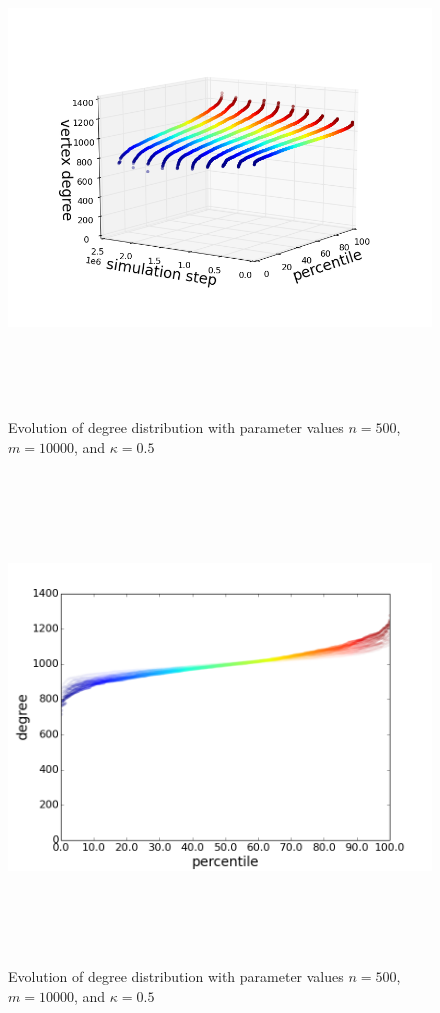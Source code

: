 \documentclass[11pt]{article}
\begin{document}
\begin{figure}[h!]
  \centering
  \includegraphics[height=130mm]{n_500_short_3d}
  \caption{Evolution of degree distribution with parameter values $n=500$, $m=10000$, and $\kappa=0.5$}
  \label{fig:500s3}
\end{figure}
\begin{figure}[h!]
  \centering
  \includegraphics[height=130mm]{n_500_short_time}
  \caption{Evolution of degree distribution with parameter values $n=500$, $m=10000$, and $\kappa=0.5$}
  \label{fig:500st}
\end{figure}
\end{document}
